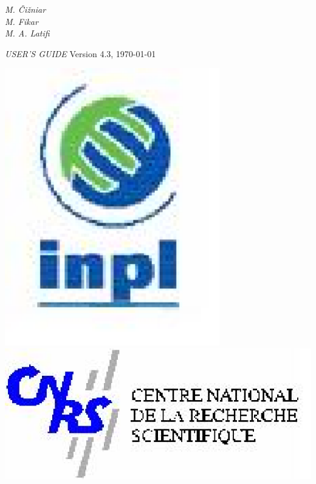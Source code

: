 \begin{minipage}[t]{1\linewidth}
\begin{minipage}[t]{0.78\linewidth}
\begin{minipage}[t]{0.82\linewidth}
\begin{flushleft}
{{{          }
        }}
      \end{flushleft}
    \end{minipage}
    \vspace{2cm}
    \begin{flushright}
      \dynopttitle
      \vspace{1cm}
      {\large{\emph{
        M. \v{C}i\v{z}niar~~~~~\\
        M. Fikar~~~~~\\
        M. A. Latifi~~~~~\\
      }}}
    \end{flushright}
    \vspace{13cm}
    {\LARGE{\emph{USER'S GUIDE}}} 
    \hfill {\large{Version 4.3, \today}}
  \end{minipage}
  \begin{minipage}[t]{0.2\linewidth}
    \vspace{0.1cm}
    \begin{center}
      \includegraphics[width=0.7\textwidth]{pictures/logoinpl}
      \vspace{0.5cm}
      \includegraphics[width=1\textwidth]{pictures/logocnrs}

\end{center}
\end{minipage}
\end{minipage}
